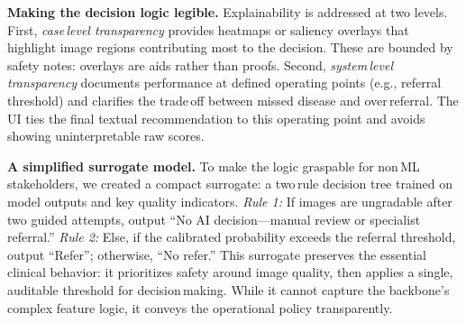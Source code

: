 \documentclass[sigplan,screen]{acmart}
\begin{document}
\textbf{Making the decision logic legible.} Explainability is addressed at two levels. First, \emph{case\,level transparency} provides heatmaps or saliency overlays that highlight image regions contributing most to the decision. These are bounded by safety notes: overlays are aids rather than proofs. Second, \emph{system\,level transparency} documents performance at defined operating points (e.g., referral threshold) and clarifies the trade\,off between missed disease and over\,referral. The UI ties the final textual recommendation to this operating point and avoids showing uninterpretable raw scores.

\textbf{A simplified surrogate model.} To make the logic graspable for non\,ML stakeholders, we created a compact surrogate: a two\,rule decision tree trained on model outputs and key quality indicators. \emph{Rule 1:} If images are ungradable after two guided attempts, output “No AI decision—manual review or specialist referral.” \emph{Rule 2:} Else, if the calibrated probability exceeds the referral threshold, output “Refer”; otherwise, “No refer.” This surrogate preserves the essential clinical behavior: it prioritizes safety around image quality, then applies a single, auditable threshold for decision\,making. While it cannot capture the backbone’s complex feature logic, it conveys the operational policy transparently.
\end{document}
